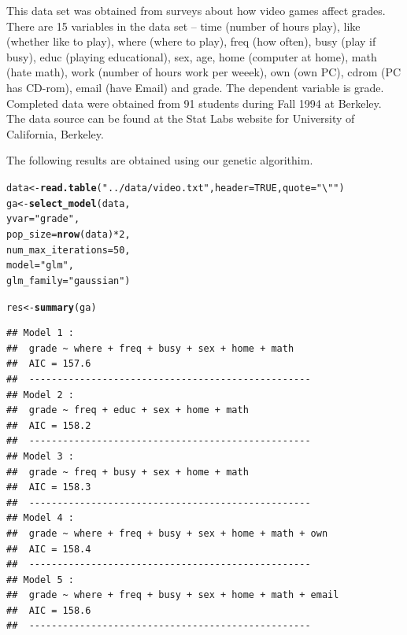 \documentclass[11pt]{article}
\makeatletter
\newcommand{\hlnum}[1]{\textcolor[rgb]{0.686,0.059,0.569}{#1}}%
\newcommand{\hlstr}[1]{\textcolor[rgb]{0.192,0.494,0.8}{#1}}%
\newcommand{\hlopt}[1]{\textcolor[rgb]{0,0,0}{#1}}%
\newcommand{\hlstd}[1]{\textcolor[rgb]{0.345,0.345,0.345}{#1}}%
\newcommand{\hlkwb}[1]{\textcolor[rgb]{0.69,0.353,0.396}{#1}}%
\newcommand{\hlkwc}[1]{\textcolor[rgb]{0.333,0.667,0.333}{#1}}%
\newcommand{\hlkwd}[1]{\textcolor[rgb]{0.737,0.353,0.396}{\textbf{#1}}}%
\newenvironment{kframe}{%
 \def\at@end@of@kframe{}%
 \ifinner\ifhmode%
  \def\at@end@of@kframe{\end{minipage}}%
  \begin{minipage}{\columnwidth}%
 \fi\fi%
 \def\FrameCommand##1{\hskip\@totalleftmargin \hskip-\fboxsep
 \colorbox{shadecolor}{##1}\hskip-\fboxsep
     \hskip-\linewidth \hskip-\@totalleftmargin \hskip\columnwidth}%
 \MakeFramed {\advance\hsize-\width
   \@totalleftmargin\z@ \linewidth\hsize
   \@setminipage}}%
 {\par\unskip\endMakeFramed%
 \at@end@of@kframe}
\newenvironment{knitrout}{}{} %
\makeatother
\begin{document}
This data set was obtained from surveys about how video games 
affect grades. There are 15 variables in the data set -- time (number of 
hours play), like (whether like to play), where (where to play), freq (how 
often), busy (play if busy), educ (playing educational), sex, age, home 
(computer at home), math (hate math), work (number of hours work per weeek), 
own (own PC), cdrom (PC has CD-rom), email (have Email) and grade. The 
dependent variable is grade. Completed data were obtained from 91 students 
during Fall 1994 at Berkeley. The data source can be found at the Stat Labs 
website for University of California, Berkeley. 

The following results are obtained using our genetic algorithim.

\begin{knitrout}
\color{fgcolor}\begin{kframe}
\begin{alltt}
\hlstd{data} \hlkwb{<-} \hlkwd{read.table}\hlstd{(}\hlstr{"../data/video.txt"}\hlstd{,} \hlkwc{header} \hlstd{=} \hlnum{TRUE}\hlstd{,} \hlkwc{quote} \hlstd{=} \hlstr{"\textbackslash{}""}\hlstd{)}
\hlstd{ga} \hlkwb{<-} \hlkwd{select_model}\hlstd{(data,}
                   \hlkwc{yvar} \hlstd{=} \hlstr{"grade"}\hlstd{,}
                   \hlkwc{pop_size} \hlstd{=} \hlkwd{nrow}\hlstd{(data)}\hlopt{*}\hlnum{2}\hlstd{,}
                   \hlkwc{num_max_iterations} \hlstd{=} \hlnum{50}\hlstd{,}
                   \hlkwc{model} \hlstd{=} \hlstr{"glm"}\hlstd{,}
                   \hlkwc{glm_family} \hlstd{=} \hlstr{"gaussian"}\hlstd{)}
\end{alltt}
\end{kframe}
\end{knitrout}

\begin{knitrout}
\color{fgcolor}\begin{kframe}
\begin{alltt}
\hlstd{res} \hlkwb{<-} \hlkwd{summary}\hlstd{(ga)}
\end{alltt}
\begin{verbatim}
## Model 1 :
##  grade ~ where + freq + busy + sex + home + math 
##  AIC = 157.6 
##  --------------------------------------------------
## Model 2 :
##  grade ~ freq + educ + sex + home + math 
##  AIC = 158.2 
##  --------------------------------------------------
## Model 3 :
##  grade ~ freq + busy + sex + home + math 
##  AIC = 158.3 
##  --------------------------------------------------
## Model 4 :
##  grade ~ where + freq + busy + sex + home + math + own 
##  AIC = 158.4 
##  --------------------------------------------------
## Model 5 :
##  grade ~ where + freq + busy + sex + home + math + email 
##  AIC = 158.6 
##  --------------------------------------------------
\end{verbatim}
\end{kframe}
\end{knitrout}
\end{document}
